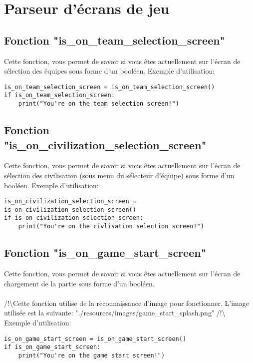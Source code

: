 
\section{Parseur d'écrans de jeu}
\subsection{Fonction "is\_on\_team\_selection\_screen"}
Cette fonction, vous permet de savoir si vous êtes actuellement sur l'écran de sélection des équipes sous forme d'un booléen.
Exemple d'utilisation:

\begin{verbatim}
is_on_team_selection_screen = is_on_team_selection_screen()
if is_on_team_selection_screen:
    print("You're on the team selection screen!")
\end{verbatim}

\subsection{Fonction "is\_on\_civilization\_selection\_screen"}
Cette fonction, vous permet de savoir si vous êtes actuellement sur l'écran de sélection des civilisation (sous menu du sélecteur d'équipe) sous forme d'un booléen.
Exemple d'utilisation:

\begin{verbatim}
is_on_civilization_selection_screen = is_on_civilization_selection_screen()
if is_on_civilization_selection_screen:
    print("You're on the civlisation selection screen!")
\end{verbatim}

\subsection{Fonction "is\_on\_game\_start\_screen"}
Cette fonction, vous permet de savoir si vous êtes actuellement sur l'écran de chargement de la partie sous forme d'un booléen.\\
\\/!\textbackslash Cette fonction utilise de la reconnaissance d'image pour fonctionner. L'image utilisée est la suivante: "./resources/images/game\_start\_splash.png" /!\textbackslash \\
Exemple d'utilisation:

\begin{verbatim}
is_on_game_start_screen = is_on_game_start_screen()
if is_on_game_start_screen:
    print("You're on the game start screen!")
\end{verbatim}

